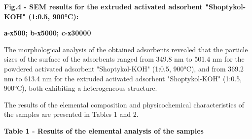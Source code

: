
{\bfseries Fig.4 - SEM results for the extruded activated adsorbent
"Shoptykol-KOH" (1:0.5, 900°C):}

{\bfseries а-х500; b-х5000; c-х30000}

The morphological analysis of the obtained adsorbents revealed that the
particle sizes of the surface of the adsorbents ranged from 349.8 nm to
501.4 nm for the powdered activated adsorbent "Shoptykol-KOH" (1:0.5,
900°C), and from 369.2 nm to 613.4 nm for the extruded activated
adsorbent "Shoptykol-KOH" (1:0.5, 900°C), both exhibiting a
heterogeneous structure.

The results of the elemental composition and physicochemical
characteristics of the samples are presented in Tables 1 and 2.

{\bfseries Table 1 - Results of the elemental analysis of the samples}

